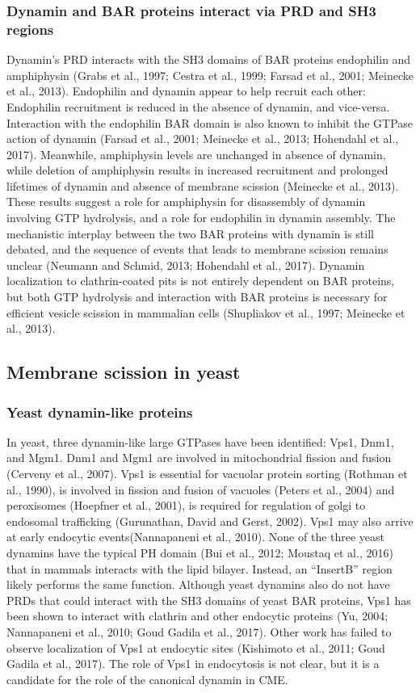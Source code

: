 		\subsubsection{Dynamin and BAR proteins interact via PRD and SH3 regions }
Dynamin’s PRD interacts with the SH3 domains of BAR proteins endophilin and amphiphysin (Grabs et al., 1997; Cestra et al., 1999; Farsad et al., 2001; Meinecke et al., 2013). Endophilin and dynamin appear to help recruit each other: Endophilin recruitment is reduced in the absence of dynamin, and vice-versa. Interaction with the endophilin BAR domain is also known to inhibit the GTPase action of dynamin (Farsad et al., 2001; Meinecke et al., 2013; Hohendahl et al., 2017). Meanwhile, amphiphysin levels are unchanged in absence of dynamin, while deletion of amphiphysin results in increased recruitment and prolonged lifetimes of dynamin and absence of membrane scission (Meinecke et al., 2013). These results suggest a role for amphiphysin for disassembly of dynamin involving GTP hydrolysis, and a role for endophilin in dynamin assembly. The mechanistic interplay between the two BAR proteins with dynamin is still debated, and the sequence of events that leads to membrane scission remains unclear (Neumann and Schmid, 2013; Hohendahl et al., 2017). Dynamin localization to clathrin-coated pits is not entirely dependent on BAR proteins, but both GTP hydrolysis and interaction with BAR proteins is necessary for efficient vesicle scission in mammalian cells (Shupliakov et al., 1997; Meinecke et al., 2013).


\label{key}

	\subsection{Membrane scission in yeast} \label {yeast_scission}
		\subsubsection{Yeast dynamin-like proteins}
In yeast, three dynamin-like large GTPases have been identified: Vps1, Dnm1, and Mgm1. Dnm1 and Mgm1 are involved in mitochondrial fission and fusion (Cerveny et al., 2007). Vps1 is essential for vacuolar protein sorting (Rothman et al., 1990), is involved in fission and fusion of vacuoles (Peters et al., 2004) and peroxisomes (Hoepfner et al., 2001), is required for regulation of golgi to endosomal trafficking (Gurunathan, David and Gerst, 2002). Vps1 may also arrive at early endocytic events(Nannapaneni et al., 2010). None of the three yeast dynamins have the typical PH domain (Bui et al., 2012; Moustaq et al., 2016) that in mammals interacts with the lipid bilayer. Instead, an “InsertB” region likely performs the same function. Although yeast dynamins also do not have PRDs that could interact with the SH3 domains of yeast BAR proteins, Vps1 has been shown to interact with clathrin and other endocytic proteins (Yu, 2004; Nannapaneni et al., 2010; Goud Gadila et al., 2017). Other work has failed to observe localization of Vps1 at endocytic sites (Kishimoto et al., 2011; Goud Gadila et al., 2017). The role of Vps1 in endocytosis is not clear, but it is a candidate for the role of the canonical dynamin in CME.




